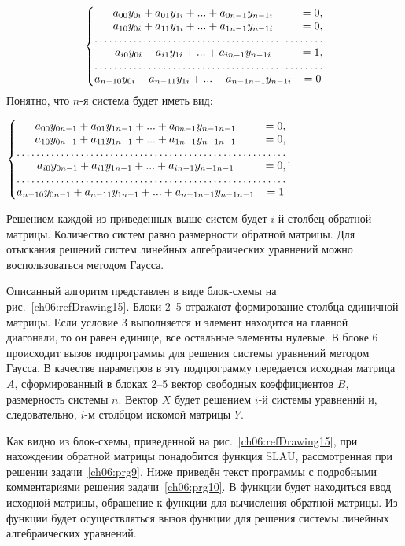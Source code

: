 \begin{equation*}
\left\{\begin{matrix}
a_{00}y_{0i}+a_{01}y_{1i}+...+a_{0n-1}y_{n-1i}&=0,\\
a_{10}y_{0i}+a_{11}y_{1i}+...+a_{1n-1}y_{n-1i}&=0,\\
\hdotsfor{2}\\
a_{i0}y_{0i}+a_{i1}y_{1i}+...+a_{in-1}y_{n-1i}&=1,\\
\hdotsfor{2}\\
a_{n-10}y_{0i}+a_{n-11}y_{1i}+...+a_{n-1n-1}y_{n-1i}&=0
\end{matrix}\right.
\end{equation*}
Понятно, что $n$-я система будет иметь вид:

$\left\{\begin{matrix}
a_{00}y_{0n-1}+a_{01}y_{1n-1}+...+a_{0n-1}y_{n-1n-1}&=0,\\
a_{10}y_{0n-1}+a_{11}y_{1n-1}+...+a_{1n-1}y_{n-1n-1}&=0,\\
\hdotsfor{2}\\
a_{i0}y_{0n-1}+a_{i1}y_{1n-1}+...+a_{in-1}y_{n-1n-1}&=0,\\
\hdotsfor{2}\\
a_{n-10}y_{0n-1}+a_{n-11}y_{1n-1}+...+a_{n-1n-1}y_{n-1n-1}&=1
\end{matrix}\right.$.

Решением каждой из приведенных выше систем будет $i$-й столбец обратной матрицы. Количество систем равно
размерности обратной матрицы. Для отыскания решений систем линейных алгебраических уравнений можно воспользоваться
методом Гаусса. 

Описанный алгоритм представлен в виде блок-схемы на рис.~\ref{ch06:refDrawing15}. Блоки 2–5 отражают формирование столбца
единичной матрицы. Если условие 3 выполняется и элемент находится на главной диагонали, то он равен единице, все
остальные элементы нулевые. В блоке 6 происходит вызов подпрограммы для решения системы уравнений методом Гаусса. В
качестве параметров в эту подпрограмму передается исходная матрица $A$, сформированный в блоках 2–5 вектор свободных
коэффициентов $B$, размерность системы $n$. Вектор $X$ будет решением $i$-й системы уравнений и, следовательно, $i$-м
столбцом искомой матрицы $Y$.

Как видно из блок-схемы, приведенной на рис.~\ref{ch06:refDrawing15}, при нахождении обратной матрицы понадобится функция
SLAU, рассмотренная при решении задачи~\ref{ch06:prg9}. Ниже приведён текст программы с подробными комментариями решения
задачи~\ref{ch06:prg10}. В функции  будет находиться ввод исходной матрицы, обращение 
к функции  для
вычисления обратной матрицы. Из функции  будет осуществляться вызов функции  
для решения системы линейных
алгебраических уравнений.

